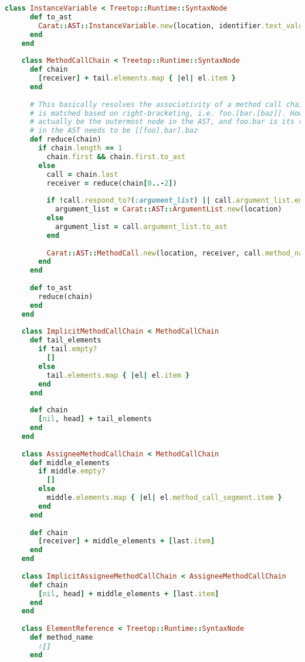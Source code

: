 \begin{lstlisting}[title={\small\ttfamily\bfseries parser/nodes.rb},language=Ruby]
    class InstanceVariable < Treetop::Runtime::SyntaxNode
      def to_ast
        Carat::AST::InstanceVariable.new(location, identifier.text_value.to_sym)
      end
    end
    
    class MethodCallChain < Treetop::Runtime::SyntaxNode
      def chain
        [receiver] + tail.elements.map { |el| el.item }
      end
      
      # This basically resolves the associativity of a method call chain. During parsing, the chain
      # is matched based on right-bracketing, i.e. foo.[bar.[baz]]. However, the call to baz should
      # actually be the outermost node in the AST, and foo.bar is its receiver. So the bracketing
      # in the AST needs to be [[foo].bar].baz
      def reduce(chain)
        if chain.length == 1
          chain.first && chain.first.to_ast
        else
          call = chain.last
          receiver = reduce(chain[0..-2])
          
          if !call.respond_to?(:argument_list) || call.argument_list.empty?
            argument_list = Carat::AST::ArgumentList.new(location)
          else
            argument_list = call.argument_list.to_ast
          end
          
          Carat::AST::MethodCall.new(location, receiver, call.method_name.to_sym, argument_list)
        end
      end
      
      def to_ast
        reduce(chain)
      end
    end
    
    class ImplicitMethodCallChain < MethodCallChain
      def tail_elements
        if tail.empty?
          []
        else
          tail.elements.map { |el| el.item }
        end
      end
    
      def chain
        [nil, head] + tail_elements
      end
    end
    
    class AssigneeMethodCallChain < MethodCallChain
      def middle_elements
        if middle.empty?
          []
        else
          middle.elements.map { |el| el.method_call_segment.item }
        end
      end
      
      def chain
        [receiver] + middle_elements + [last.item]
      end
    end
    
    class ImplicitAssigneeMethodCallChain < AssigneeMethodCallChain
      def chain
        [nil, head] + middle_elements + [last.item]
      end
    end
    
    class ElementReference < Treetop::Runtime::SyntaxNode
      def method_name
        :[]
      end
      

\end{lstlisting}
